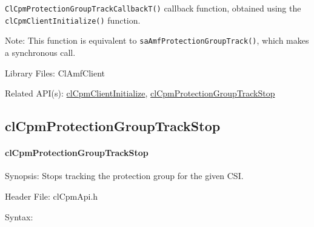 {\begin{Desc}
{\tt{Cl\-Cpm\-Protection\-Group\-Track\-Callback\-T()}} callback function, obtained using the {\tt{cl\-Cpm\-Client\-Initialize()}} function.\end{Desc}
\begin{Desc}
\item[Note:]This function is equivalent to {\tt{sa\-Amf\-Protection\-Group\-Track()}}, which makes a synchronous call.\end{Desc}
\begin{Desc}
\item[Library Files:]Cl\-Amf\-Client\end{Desc}

\begin{Desc}
\item[Related API(s):]\hyperlink{group__group14}{cl\-Cpm\-Client\-Initialize}, \hyperlink{group__group14}{cl\-Cpm\-Protection\-Group\-Track\-Stop} \end{Desc}
\newpage







\subsection{clCpmProtectionGroupTrackStop}
\hypertarget{pagecpm124}{}\paragraph{cl\-Cpm\-Protection\-Group\-Track\-Stop}\label{pagecpm124}
\begin{Desc}
\item[Synopsis:]Stops tracking the protection group for the given CSI.\end{Desc}
\begin{Desc}
\item[Header File:]clCpmApi.h\end{Desc}
\begin{Desc}
\item[Syntax:]


\end{Desc}}
